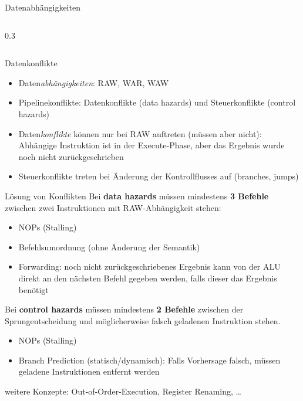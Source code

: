 \begin{frame}[c, fragile]{Datenabhängigkeiten}{}
\begin{columns}[c]
\begin{column}{0.3\textwidth}
{{\begin{enumerate}[i.]
			\end{enumerate}
			}
			\vspace{\baselineskip}
			}
		\end{column}
	\end{columns}
\end{frame}

\begin{frame}[c, fragile]{Datenkonflikte}{}
	\begin{itemize}
		\item Daten\textit{abhängigkeiten}: RAW, WAR, WAW
		\item Pipelinekonflikte: Datenkonflikte (data hazards) und Steuerkonflikte (control hazards)
		\item Daten\textit{konflikte} können nur bei RAW auftreten (müssen aber nicht): Abhängige Instruktion ist in der Execute-Phase, aber das Ergebnis wurde noch nicht zurückgeschrieben
		\item Steuerkonflikte treten bei Änderung der Kontrollflusses auf (branches, jumps)
	\end{itemize}
\end{frame}

\begin{frame}[c, fragile]{Lösung von Konflikten}
	Bei \textbf{data hazards} müssen mindestens \textbf{3 Befehle} zwischen zwei Instruktionen mit RAW-Abhängigkeit stehen:
	\begin{itemize}
		\item NOPs (Stalling)
		\item Befehlsumordnung (ohne Änderung der Semantik)
		\item Forwarding: noch nicht zurückgeschriebenes Ergebnis kann von der ALU direkt an den nächsten Befehl gegeben werden, falls dieser das Ergebnis benötigt
	\end{itemize}
	\vspace{0.5cm}
	Bei \textbf{control hazards} müssen mindestens \textbf{2 Befehle} zwischen der Sprungentscheidung und möglicherweise falsch geladenen Instruktion stehen.
	\begin{itemize}
		\item NOPs (Stalling)
		\item Branch Prediction (statisch/dynamisch): Falls Vorhersage falsch, müssen geladene Instruktionen entfernt werden
	\end{itemize}
	\vspace{0.5cm}
	weitere Konzepte: Out-of-Order-Execution, Register Renaming, \ldots
\end{frame}

